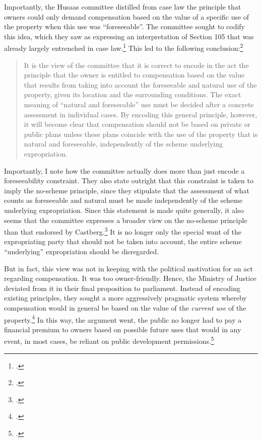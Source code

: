 Importantly, the Husaas committee distilled from case law the principle that owners could only demand compensation based on the value of a specific use of the property when this use was ``foreseeable''.
The committee sought to codify this idea, which they saw as expressing an interpretation of Section 105 that was already largely entrenched in case law.\footcite[134]{nut69} This led to the following conclusion:\footnote{\cite[142]{nut69}.}

\begin{quote}
It is the view of the committee that it is correct to encode in the act the principle that the owner is entitled to compensation based on the value that results from taking into account the foreseeable and natural use of the property, given its location and the surrounding conditions. The exact meaning of ``natural and foreseeable'' use must be decided after a concrete assessment in individual cases. By encoding this general principle, however, it will become clear that compensation should not be based on private or public plans unless these plans coincide with the use of the property that is natural and foreseeable, independently of the scheme underlying expropriation.
\end{quote}

Importantly, I note how the committee actually does more than just encode a foreseeability constraint. They also state outright that this constraint is taken to imply the no-scheme principle, since they stipulate that the assessment of what counts as foreseeable and natural must be made independently of the scheme underlying expropriation. Since this statement is made quite generally, it also seems that the committee expresses a broader view on the no-scheme principle than that endorsed by Castberg.\footcite[268]{castberg64b} It is no longer only the special want of the expropriating party that should not be taken into account, the entire scheme ``underlying'' expropriation should be disregarded.

But in fact, this view was not in keeping with the political motivation for an act regarding compensation. It was too owner-friendly. Hence, the Ministry of Justice deviated from it in their final proposition to parliament. Instead of encoding existing principles, they sought a more aggressively pragmatic system whereby compensation would in general be based on the value of the \emph{current use} of the property.\footnote{\cite[19-20]{otprp59}.} In this way, the argument went, the public no longer had to pay a financial premium to owners based on possible future uses that would in any event, in most cases, be reliant on public development permissions.\footnote{\cite[17-20]{otprp59}.} 

